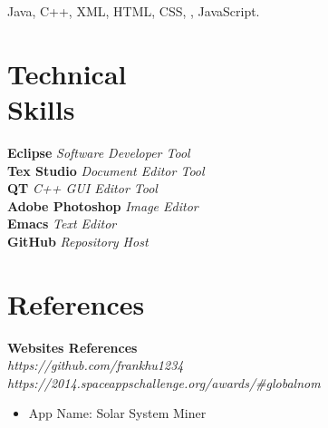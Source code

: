 \documentclass[margin,line]{resume}
\begin{document}
\begin{resume}
    Java, C++, XML, HTML, CSS, \LaTeXe, JavaScript.

   \section{\mysidestyle Technical\\ Skills}

    \textbf{Eclipse} \hfill
    \textsl{Software Developer Tool}
    \vspace{1mm}\\
  	\textbf{Tex Studio} \hfill
    \textsl{Document Editor Tool}  \vspace{1mm}\\	
    \textbf{QT} \hfill
     \textsl{C++ GUI Editor Tool}  \vspace{1mm}\\
     \textbf{Adobe Photoshop} \hfill
     \textsl{Image Editor}  
     \vspace{1mm}\\
     \textbf{Emacs} \hfill
     \textsl{Text Editor} 
      \vspace{1mm}\\  
      \textbf{GitHub} \hfill
      \textsl{Repository Host} 
      \vspace{1mm}\\                
                                       



\section{\mysidestyle References} 



\textbf{Websites References}
      \vspace{1mm}\\      
\textsl{https://github.com/frankhu1234}
      \vspace{1mm}\\  
\textsl{https://2014.spaceappschallenge.org/awards/\#globalnom}    
	\begin{itemize}
	\item App Name: Solar System Miner
	\end{itemize}



\end{resume}
\end{document}

